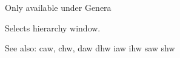 
Only available under Genera

Selects hierarchy window.

See also: caw, chw, daw dhw iaw ihw saw shw
